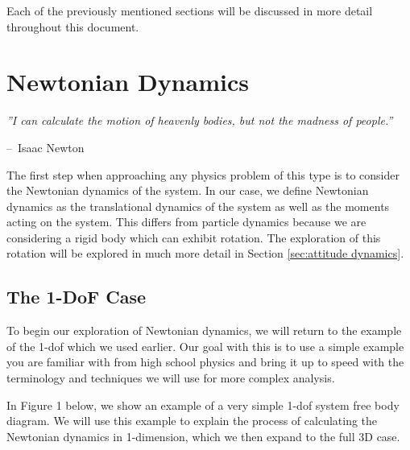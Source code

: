 \documentclass[12pt]{report}
\makeatletter
\newenvironment{chapquote}[2][2em]
  {\setlength{\@tempdima}{#1}%
   \def\chapquote@author{#2}%
   \parshape 1 \@tempdima \dimexpr\textwidth-2\@tempdima\relax%
   \itshape}
  {\par\normalfont\hfill--\ \chapquote@author\hspace*{\@tempdima}\par\bigskip}
\makeatother
\begin{document}
Each of the previously mentioned sections will be discussed in more detail throughout this document.

\chapter{Newtonian Dynamics}\label{sec: Newtonian Dynamics}
\begin{chapquote}{Isaac Newton}
''I can calculate the motion of heavenly bodies, but not the madness of people.''
\end{chapquote}
The first step when approaching any physics problem of this type is to consider the Newtonian dynamics of the system. In our case, we define Newtonian dynamics as the translational dynamics of the system as well as the moments acting on the system. This differs from particle dynamics because we are considering a rigid body which can exhibit rotation. The exploration of this rotation will be explored in much more detail in Section \ref{sec:attitude dynamics}. 
\section{The 1-DoF Case}\label{sec: The 1DoF Case}
To begin our exploration of Newtonian dynamics, we will return to the example of the 1-\gls{dof} which we used earlier. Our goal with this is to use a simple example you are familiar with from high school physics and bring it up to speed with the terminology and techniques we will use for more complex analysis.

In Figure 1 below, we show an example of a very simple 1-\gls{dof} system free body diagram. We will use this example to explain the process of calculating the Newtonian dynamics in 1-dimension, which we then expand to the full 3D case. 

\end{document}
